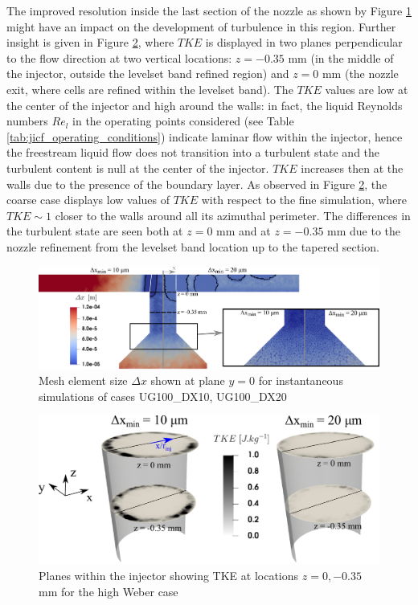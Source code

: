 The improved resolution inside the last section of the nozzle as shown by Figure \ref{fig:jicf_injector_resolution_with_mesh} might have an impact on the development of turbulence in this region. Further insight is given in Figure \ref{fig:jicf_nozzle_disks}, where $TKE$ is displayed in two planes perpendicular to the flow direction at two vertical locations: $z = -0.35$ mm (in the middle of the injector, outside the levelset band refined region) and $z = 0$ mm (the nozzle exit, where cells are refined within the levelset band). The $TKE$ values are low at the center of the injector and high around the walls: in fact, the liquid Reynolds numbers $Re_l$ in the operating points considered (see Table \ref{tab:jicf_operating_conditions}) indicate laminar flow within the injector, hence the freestream liquid flow does not transition into a turbulent state and the turbulent content is null at the center of the injector. $TKE$ increases then at the walls due to the presence of the boundary layer. As observed in Figure \ref{fig:jicf_nozzle_disks}, the coarse case displays low values of $TKE$ with respect to the fine simulation, where $TKE \sim 1$ closer to the walls around all its azimuthal perimeter. The differences in the turbulent state are seen both at $z = 0$ mm and at $z = -0.35$ mm due to the nozzle refinement from the levelset band location up to the tapered section.


\begin{figure}[ht]
	\centering
   \includegraphics[scale=0.28]{./part2_developments/figures_ch5_resolved_JICF/instabilities_resolution/injector_resolution_with_mesh}
   \caption{Mesh element size $\Delta x$ shown at plane $y = 0$ for instantaneous simulations of cases UG100\_DX10, UG100\_DX20}
   \label{fig:jicf_injector_resolution_with_mesh}
\end{figure}

\begin{figure}[ht]
	\centering
   \includegraphics[scale=0.5]{./part2_developments/figures_ch5_resolved_JICF/instabilities_resolution/injector_visualization_disks}
   \caption{Planes within the injector showing TKE at locations $z = 0, -0.35$ mm for the high Weber case}
   \label{fig:jicf_nozzle_disks}
\end{figure}


